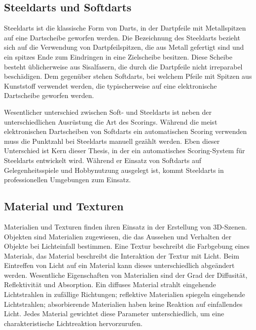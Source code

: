 
\subsection{Steeldarts und Softdarts}
\label{sec:steeldarts}

Steeldarts ist die klassische Form von Darts, in der Dartpfeile mit Metallspitzen auf eine Dartscheibe geworfen werden. Die Bezeichnung des Steeldarts bezieht sich auf die Verwendung von Dartpfeilspitzen, die aus Metall gefertigt sind und ein spitzes Ende zum Eindringen in eine Zielscheibe besitzen. Diese Scheibe besteht üblicherweise aus Sisalfasern, die durch die Dartpfeile nicht irreparabel beschädigen. Dem gegenüber stehen Softdarts, bei welchem Pfeile mit Spitzen aus Kunststoff verwendet werden, die typischerweise auf eine elektronische Dartscheibe geworfen werden.

Wesentlicher unterschied zwischen Soft- und Steeldarts ist neben der unterschiedlichen Ausrüstung die Art des Scorings. Während die meist elektronischen Dartscheiben von Softdarts ein automatischen Scoring verwenden muss die Punktzahl bei Steeldarts manuell gezählt werden. Eben dieser Unterschied ist Kern dieser Thesis, in der ein automatisches Scoring-System für Steeldarts entwickelt wird. Während er Einsatz von Softdarts auf Gelegenheitsspiele und Hobbynutzung ausgelegt ist, kommt Steeldarts in professionellen Umgebungen zum Einsatz.


\subsection{Material und Texturen}  %

Materialien und Texturen finden ihren Einsatz in der Erstellung von 3D-Szenen. Objekten sind Materialien zugewiesen, die das Aussehen und Verhalten der Objekte bei Lichteinfall bestimmen. Eine Textur beschreibt die Farbgebung eines Materials, das Material beschreibt die Interaktion der Textur mit Licht. Beim Eintreffen von Licht auf ein Material kann dieses unterschiedlich abgeändert werden. Wesentliche Eigenschaften von Materialien sind der Grad der Diffusität, Reflektivität und Absorption. Ein diffuses Material strahlt eingehende Lichtstrahlen in zufällige Richtungen; reflektive Materialien spiegeln eingehende Lichtstrahlen; absorbierende Materialien haben keine Reaktion auf einfallendes Licht. Jedes Material gewichtet diese Parameter unterschiedlich, um eine charakteristische Lichtreaktion hervorzurufen.

